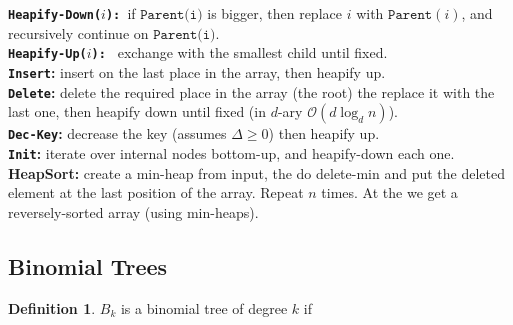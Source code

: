 \documentclass[]{article}
\newcommand\compactsubsection[1]        {\vspace{-10pt}\subsection{#1}\vspace{-5pt}}
\theoremstyle{definition}
\newtheorem{Definition}{\color{defiColor}Definition}
\newcommand\defi  [1] {\begin{Definition}#1\end{Definition}}
\newcommand\oc    {\mathcal{O}}
\begin{document}
\begin{multicols}{4}
\begin{figure}
				\end{figure}
				\textbf{\texttt{Heapify-Down($i$): }}if $\texttt{Parent(i)}$ is bigger, then replace $i$ with $\texttt{Parent}(i)$, and recursively continue on $\texttt{Parent(i)}$. \\
				\textbf{\texttt{Heapify-Up($i$): }} exchange with the smallest child until fixed. \\
				\textbf{\texttt{Insert}: }insert on the last place in the array, then heapify up. \\ 
				\textbf{\texttt{Delete}: }delete the required place in the array (the root) the replace it with the last one, then heapify down until fixed (in $d$-ary $\oc(d\log_dn)$). \\
				\textbf{\texttt{Dec-Key}: }decrease the key (assumes $\Delta \ge 0$) then heapify up. \\
				\textbf{\texttt{Init}: }iterate over internal nodes bottom-up, and heapify-down each one. \\
				\textbf{HeapSort: }create a min-heap from input, the do delete-min and put the deleted element at the last position of the array. Repeat $n$ times. At the we get a reversely-sorted array (using min-heaps). 
			
			\compactsubsection{Binomial Trees}
				\defi{$B_k$ is a binomial tree of degree $k$ if
				
}
\end{multicols}
\end{document}
